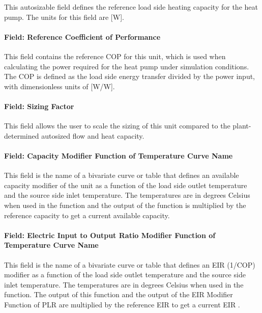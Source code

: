 This autosizable field defines the reference load side heating capacity for the heat pump. The units for this field are [W].

\paragraph{Field: Reference Coefficient of Performance}\label{plhp_eir_heating_inputs_reference_cop}

This field contains the reference COP for this unit, which is used when calculating the power required for the heat pump under simulation conditions. The COP is defined as the load side energy transfer divided by the power input, with dimensionless units of [W/W].

\paragraph{Field: Sizing Factor}\label{plhp_eir_heating_inputs_sizing_factor}

This field allows the user to scale the sizing of this unit compared to the plant-determined autosized flow and heat capacity.

\paragraph{Field: Capacity Modifier Function of Temperature Curve Name}\label{plhp_eir_heating_inputs_capft}

This field is the name of a bivariate curve or table that defines an available capacity modifier of the unit as a function of the load side outlet temperature and the source side inlet temperature. The temperatures are in degrees Celsius when used in the function and the output of the function is multiplied by the reference capacity to get a current available capacity.

\paragraph{Field: Electric Input to Output Ratio Modifier Function of Temperature Curve Name}\label{plhp_eir_heating_inputs_eirft}

This field is the name of a bivariate curve or table that defines an EIR (1/COP) modifier as a function of the load side outlet temperature and the source side inlet temperature. The temperatures are in degrees Celsius when used in the function. The output of this function and the output of the EIR Modifier Function of PLR are multiplied by the reference EIR to get a current EIR .

